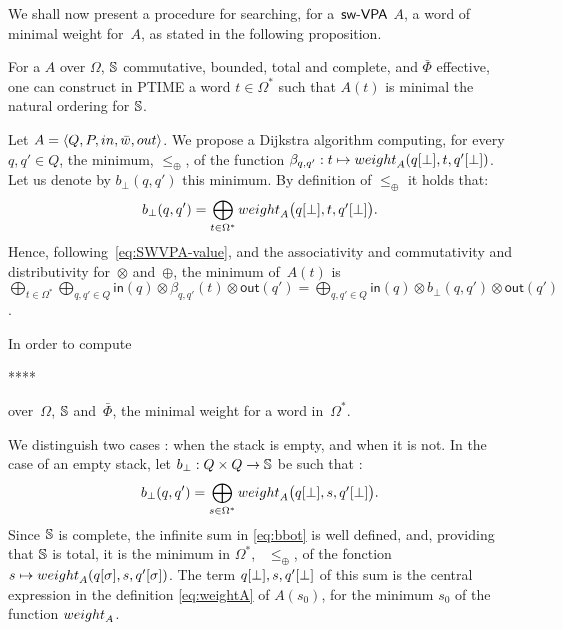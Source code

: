 \label{sec:best}\label{sec:search}
\noindent
We shall now present a procedure for searching, for a~$\textsf{sw-VPA}$ $A$, 
a word %
of minimal weight for~$A$, 
as stated in the following proposition. %
%
\begin{proposition}\label{th:best-search}
For a \SWVPA $A$ 
over $\Omega$, 
$\mathbb{S}$ commutative, bounded, total and complete, %
and $\bar\Phi$ effective, %
one can construct in PTIME a word $t \in \Omega^*$ 
such that $A(t)$ is minimal \wrt the natural ordering for $\mathbb{S}$. 
\end{proposition} 
%
Let $A = \< Q, P, \init, \bar\wei, \final >$.
%
We propose a Dijkstra algorithm computing,
for every $q, q' \in Q$, 
the minimum, \wrt $\leq_\oplus$, of the function 
$\beta_{q, q'} : t \mapsto \weight_A(\config{q}{\bot}, t, \config{q'}{\bot})$.
Let us denote by $b_\bot(q, q')$ this minimum. 
By definition of $\leq_\oplus$ it holds that:
%
\begin{equation}\label{eq:bbot}
  b_\bot(q, q') = \bigoplus_{t\in \Omega^*} 
  \textstyle
  \weight_A\bigl(\config{q}{\bot}, t, \config{q'}{\bot}\bigr).
\end{equation}
Hence, following~\eqref{eq:SWVPA-value}, and the associativity and commutativity 
and distributivity for~$\otimes$ and~$\oplus$, the minimum of~$A(t)$ is 
\(
{\displaystyle\bigoplus_{t\in \Omega^*}}
{\displaystyle\bigoplus_{q, q' \in Q}} \textstyle
\mathsf{in}(q) \mathop{\otimes} 
\beta_{q, q'}(t)
\mathop{\otimes} \mathsf{out}(q')
= 
{\displaystyle\bigoplus_{q, q' \in Q}} \textstyle
\mathsf{in}(q) \mathop{\otimes} 
b_\bot(q, q')
\mathop{\otimes} \mathsf{out}(q')
\).

\noindent
In order to compute 

****

over~$\Omega$, $\mathbb{S}$ and~$\bar\Phi$, 
the minimal weight %
for a word in~$\Omega^*$.
%




\noindent
We distinguish two cases : when the stack is empty, and when it is not. 
%
In the case of an empty stack, let $b_\bot : Q \times Q \to \mathbb{S}$ be such that : %
%
\begin{equation}\label{eq:bbot}
  b_\bot(q, q') = \bigoplus_{s\in \Omega^*} 
  \textstyle
  \weight_A\bigl(\config{q}{\bot}, s, \config{q'}{\bot}\bigr).
\end{equation}
%
Since $\mathbb{S}$ is complete, the infinite sum in \eqref{eq:bbot} is well defined,
and, providing that $\mathbb{S}$ is total, it is the minimum in $\Omega^*$,
\wrt~$\leq_\oplus$, %
of the fonction 
$s \mapsto \weight_A(\config{q}{\sigma}, s, \config{q'}{\sigma})$.
%
The term $q[{\bot}], s, q'[{\bot}]$ 
of this sum is the central expression in 
the definition \eqref{eq:weightA} of $A(s_0)$, for the minimum $s_0$
of the function $\weight_A$.

